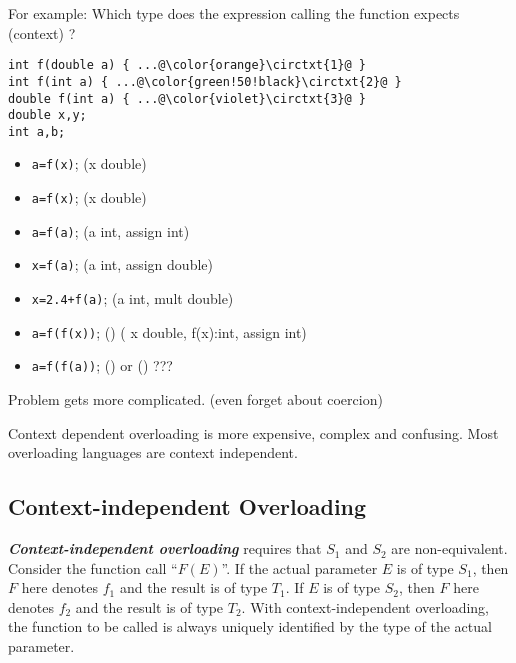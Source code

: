 For example:
Which type does the expression calling the function expects (context) ?
\begin{listing}[H]

\begin{verbatim}
int f(double a) { ...@\color{orange}\circtxt{1}@ }
int f(int a) { ...@\color{green!50!black}\circtxt{2}@ } 
double f(int a) { ...@\color{violet}\circtxt{3}@ }  
double x,y; 
int a,b;
\end{verbatim}
\caption{}
\label{code:code4}

\end{listing}

\begin{itemize}[leftmargin=*]
  \item[] \texttt{a=f(x)}; {\color{orange}} (x double)
  \item[] \texttt{a=f(x)}; {\color{orange}} (x double)
  \item[] \texttt{a=f(a)}; {\color{green!50!black}} (a int, assign int)
  \item[] \texttt{x=f(a)}; {\color{violet}} (a int, assign double)
  \item[] \texttt{x=2.4+f(a)}; {\color{violet}} (a int, mult double)
  \item[] \texttt{a=f(f(x))}; {\color{green!50!black}}({\color{orange}}) ( x double, f(x):int, assign int)
  \item[] \texttt{a=f(f(a))}; {\color{green!50!black}}({\color{green!50!black}}) or {\color{orange}}({\color{violet}}) ???
\end{itemize}
Problem gets more complicated. (even forget about coercion)

Context dependent overloading is more expensive, complex and confusing. Most overloading languages are context independent.

\subsection{Context-independent Overloading}
\label{subsec:independ-overload}

\textit{\textbf{Context-independent overloading}} requires that $S_1$ and $S_2$ are non-equivalent. Consider the function call ``$F(E)$''. If the actual parameter $E$ is of type $S_1$, then $F$ here denotes $f_1$ and the result is of type $T_1$. If $E$ is of type $S_2$, then $F$ here denotes $f_2$ and the result is of type $T_2$. With context-independent overloading, the function to be called is always uniquely identified by the type of the actual parameter.

